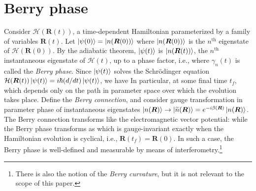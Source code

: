 \documentclass[reprint,
nofootinbib,
amsmath,amssymb,
aps]{revtex4-1}
\newcommand{\f}[2]{\frac{#1}{#2}}
\begin{document}
\section{Berry phase}\label{sect:berry}
Consider $\mathcal{H}(\bm{R}(t))$, a time-dependent Hamiltonian parameterized by a family of variables $\bm{R}(t)$. Let $\ket{\psi(0)} = \ket{n(\bm{R}(0))}$ where $\ket{n(\bm{R}(0))}$ is the $n^\text{th}$ eigenstate of $\mathcal{H}(\bm{R}(0))$. By the adiabatic theorem, $\ket{\psi(t)}$ is $\ket{n(\bm{R}(t))}$, the $n^\text{th}$ instantaneous eigenstate of $\mathcal{H}(t)$, up to a phase factor, i.e.,
where $\gamma_n(t)$ is called the \textit{Berry phase}. Since $\ket{\psi(t)}$ solves the Schr\"{o}dinger equation $\mathcal{H}(\bm{R}(t)) \ket{\psi(t)} = i\hbar (d/dt) \ket{{\psi}(t)}$, we have 
In particular, at some final time $t_f$,
which depends only on the path in parameter space over which the evolution takes place. Define the \textit{Berry connection}, 
and consider gauge transformation in parameter phase of instantaneous eigenstates $\ket{n(\bm{R})} \to \ket{\widetilde{n}(\bm{R})} = e^{-i\beta(\bm{R})}\ket{n(\bm{R})}$. The Berry connection transforms like the electromagnetic  vector potential:
while the Berry phase transforms as
which is gauge-invariant exactly when the Hamiltonian evolution is cyclical, i.e., $\bm{R}(t_f) = \bm{R}(0)$. In such a case, the Berry phase is well-defined and measurable by means of interferometry.\footnote{There is also the notion of the \textit{Berry curvature}, but it is not relevant to the scope of this paper.}
\end{document}
